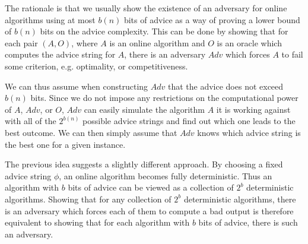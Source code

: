 The rationale is that we usually show the existence of an adversary for
online algorithms using at most $b(n)$ bits of advice as a way of proving
a lower bound of $b(n)$ bits on the advice complexity. This can be done by
showing that for each pair $(A, O)$, where $A$ is an online algorithm and
$O$ is an oracle which computes the advice string for $A$, there is an
adversary $Adv$ which forces $A$ to fail some criterion, e.g. optimality,
or competitiveness.

We can thus assume when constructing $Adv$ that the advice does not exceed
$b(n)$ bits. Since we do not impose any restrictions on the computational
power of $A$, $Adv$, or $O$, $Adv$ can easily simulate the algorithm $A$
it is working against with all of the $2^{b(n)}$ possible advice strings
and find out which one leads to the best outcome. We can then simply
assume that $Adv$ knows which advice string is the best one for a given
instance.

The previous idea suggests a slightly different approach. By choosing a
fixed advice string $\phi$, an online algorithm becomes fully
deterministic. Thus an algorithm with $b$ bits of advice can be viewed
as a collection of $2^b$ deterministic algorithms. Showing that for any
collection of $2^b$ deterministic algorithms, there is an adversary which
forces each of them to compute a bad output is therefore equivalent to
showing that for each algorithm with $b$ bits of advice, there is such an
adversary.
